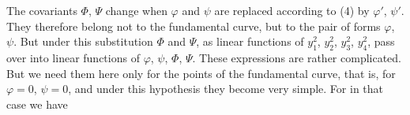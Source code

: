 The covariants $\Phi$, $\Psi$ change when $\varphi$ and $\psi$ are
replaced according to (4) by $\varphi'$, $\psi'$. They therefore belong
not to the fundamental curve, but to the pair of forms $\varphi$,
$\psi$. But under this substitution $\Phi$ and $\Psi$, as linear
functions of $y_1^2$, $y_2^2$, $y_3^2$, $y_4^2$, pass over into linear
functions of $\varphi$, $\psi$, $\Phi$, $\Psi$. These expressions are
rather complicated. But we need them here only for the points of the
fundamental curve, that is, for $\varphi = 0$, $\psi = 0$, and under
this hypothesis they become very simple. For in that case we have
